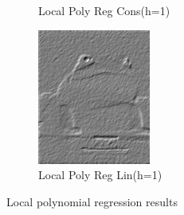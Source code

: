 \documentclass{beamer}
\begin{document}
\begin{frame}
\begin{figure}[htb]
\begin{subfigure}[b]{0.24\linewidth}
      \caption{Local Poly Reg Cons(h=1)}
    \end{subfigure}
    \begin{subfigure}[b]{0.24\linewidth}
      \includegraphics[width=\linewidth]{images/poly_nr_lin_true.png}
      \caption{Local Poly Reg Lin(h=1)}
    \end{subfigure}
    \caption{Local polynomial regression results}
    \label{fig:local_poly}
  \end{figure}

\end{frame}
\end{document}

